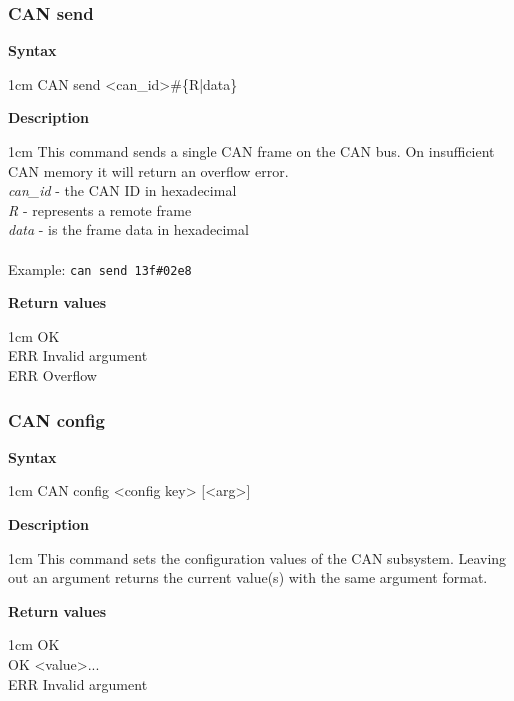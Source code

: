 \documentclass{article}[a4paper]
\begin{document}
\subsubsection{CAN send}
\begin{tcolorbox}
	{\bf Syntax}

	 1cm \dimexpr\linewidth-2cm\relax
	CAN send <can\_id>\#\{R|data\}

	\medskip
	{\bf Description}

	 1cm \dimexpr\linewidth-2cm\relax
	This command sends a single CAN frame on the CAN bus. On insufficient CAN
	memory it will return an overflow error.
	\medskip \\
	{\it can\_id} - the CAN ID in hexadecimal \\
	{\it R} - represents a remote frame \\
	{\it data} - is the frame data in hexadecimal \\
	\medskip \\
	Example: \texttt{can send 13f\#02e8}

	\medskip
	{\bf Return values}

	 1cm \dimexpr\linewidth-2cm\relax
	OK \\
	ERR Invalid argument \\
	ERR Overflow
\end{tcolorbox}

\subsubsection{CAN config}
\begin{tcolorbox}
	{\bf Syntax}

	 1cm \dimexpr\linewidth-2cm\relax
	CAN config <config key> [<arg>]

	\medskip
	{\bf Description}

	 1cm \dimexpr\linewidth-2cm\relax
	This command sets the configuration values of the CAN subsystem.
	Leaving out an argument returns the current value(s) with the same argument
	format.

	\medskip
	{\bf Return values}

	 1cm \dimexpr\linewidth-2cm\relax
	OK \\
	OK <value>... \\
	ERR Invalid argument
\end{tcolorbox}
\end{document}
